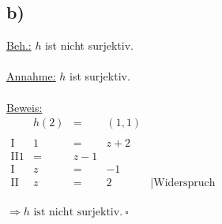 \documentclass[a4paper]{scrartcl}
\newcommand{\qed}{\ \square}
\begin{document}
	\subsection{b)}
		\underline{Beh.:} \(h\) ist nicht surjektiv. \\ \\
		\underline{Annahme:} \(h\) ist surjektiv. \\ \\
		\underline{Beweis:} \\
		\(
		\begin{array}{lrcll}
			&h(2)&=&(1,1) \\ \\
			\text{I}&1&=&z+2 \\
			\text{II}1&=&z-1 \\
			\text{I}&z&=&-1 \\
			\text{II}&z&=&2 &\mid \text{Widerspruch}
		\end{array}
		\)\\ \\
		\(\Rightarrow h \text{ ist nicht surjektiv.}\qed\)
\end{document}
